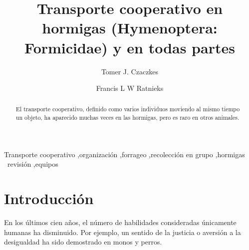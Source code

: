 \documentclass[final,5p, 12pt,authoryear]{elsarticle}
\title{Transporte cooperativo en hormigas (Hymenoptera: Formicidae) y en todas partes}
\author[rvt]{Tomer J. Czaczkes}
\author[rvt]{Francis L W Ratnieks}
\begin{document}
\begin{frontmatter}
\begin{abstract}
  El transporte cooperativo, definido como varios individuos moviendo al mismo tiempo un objeto, ha aparecido muchas veces en las hormigas, pero es raro en otros animales.
\end{abstract}
\begin{keyword}
  Transporte cooperativo \sep organización \sep forrageo \sep recolección en grupo \sep hormigas \ revisión \sep equipos
\end{keyword}


\end{frontmatter}

\section*{Introducción}
\label{sec:introduccion}

En los últimos cien años, el número de habilidades consideradas únicamente humanas ha disminuido. Por ejemplo, un sentido de la justicia o aversión a la desigualdad ha sido demostrado en monos y perros.
\end{document}

